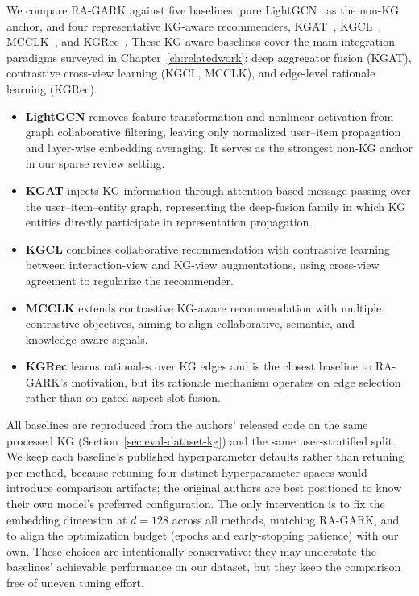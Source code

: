 We compare RA-GARK against five baselines: pure LightGCN~\cite{he2020lightgcn} as the non-KG anchor, and four representative KG-aware recommenders, KGAT~\cite{wang2019kgat}, KGCL~\cite{yang2022kgcl}, MCCLK~\cite{zou2022mcclk}, and KGRec~\cite{yang2023kgrec}. These KG-aware baselines cover the main integration paradigms surveyed in Chapter~\ref{ch:relatedwork}: deep aggregator fusion (KGAT), contrastive cross-view learning (KGCL, MCCLK), and edge-level rationale learning (KGRec).

\begin{itemize}
  \item \textbf{LightGCN} removes feature transformation and nonlinear activation from graph collaborative filtering, leaving only normalized user--item propagation and layer-wise embedding averaging. It serves as the strongest non-KG anchor in our sparse review setting.
  \item \textbf{KGAT} injects KG information through attention-based message passing over the user--item--entity graph, representing the deep-fusion family in which KG entities directly participate in representation propagation.
  \item \textbf{KGCL} combines collaborative recommendation with contrastive learning between interaction-view and KG-view augmentations, using cross-view agreement to regularize the recommender.
  \item \textbf{MCCLK} extends contrastive KG-aware recommendation with multiple contrastive objectives, aiming to align collaborative, semantic, and knowledge-aware signals.
  \item \textbf{KGRec} learns rationales over KG edges and is the closest baseline to RA-GARK's motivation, but its rationale mechanism operates on edge selection rather than on gated aspect-slot fusion.
\end{itemize}

All baselines are reproduced from the authors' released code on the same processed KG (Section~\ref{sec:eval-dataset-kg}) and the same user-stratified split. We keep each baseline's published hyperparameter defaults rather than retuning per method, because retuning four distinct hyperparameter spaces would introduce comparison artifacts; the original authors are best positioned to know their own model's preferred configuration. The only intervention is to fix the embedding dimension at $d = 128$ across all methods, matching RA-GARK, and to align the optimization budget (epochs and early-stopping patience) with our own. These choices are intentionally conservative: they may understate the baselines' achievable performance on our dataset, but they keep the comparison free of uneven tuning effort.

